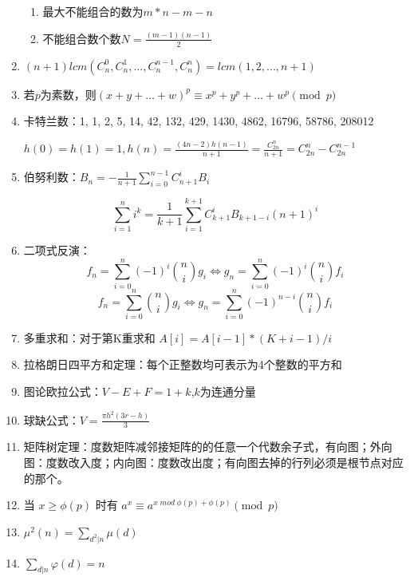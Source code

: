 \begin{enumerate}
\begin{enumerate}
\item 最大不能组合的数为$m*n-m-n$
\item 不能组合数个数$N=\frac{(m-1)(n-1)}{2}$
\end{enumerate}

\item $(n+1)lcm(C_n^0,C_n^1,...,C_n^{n-1},C_n^{n})=lcm(1,2,...,n+1)$

\item 若$p$为素数，则$(x+y+...+w)^p\equiv x^p+y^p+...+w^p\pmod p$

\item 卡特兰数：1, 1, 2, 5, 14, 42, 132, 429, 1430, 4862, 16796, 58786, 208012

$h(0)=h(1)=1,h(n)=\frac{(4n-2)h(n-1)}{n+1}=\frac{C_{2n}^n}{n+1}=C_{2n}^n-C_{2n}^{n-1}$

\item 伯努利数：$B_n = -\frac{1}{n+1} \sum_{i=0}^{n-1} C_{n+1}^i B_i$

$$\sum_{i=1}^n i^k = \frac{1}{k+1} \sum_{i=1}^{k+1}C_{k+1}^i B_{k+1-i}(n+1)^i$$

\item 二项式反演：$$f_n = \sum_{i = 0} ^ n (-1) ^ i \binom{n}{i} g_i \Leftrightarrow g_n = \sum_{i = 0} ^ n (-1) ^ i \binom{n}{i} f_i$$
$$f_n = \sum_{i = 0} ^ n \binom{n}{i} g_i \Leftrightarrow g_n = \sum_{i = 0} ^ n (-1) ^ {n - i} \binom{n}{i} f_i$$

\item 多重求和：对于第K重求和 $A[i]=A[i-1]*(K+i-1)/i$

\item 拉格朗日四平方和定理：每个正整数均可表示为4个整数的平方和

\item 图论欧拉公式：$V-E+F=1+k$,$k$为连通分量

\item 球缺公式：$V=\frac{\pi h^2(3r-h)}{3}$

\item 矩阵树定理：度数矩阵减邻接矩阵的的任意一个代数余子式，有向图；外向图：度数改入度；内向图：度数改出度；有向图去掉的行列必须是根节点对应的那个。

\item 当 $x\geq\phi(p)$ 时有 $a^x\equiv a^{x \; mod \; \phi(p) + \phi(p)}\pmod p$

\item $\mu^2(n)=\sum_{d^2|n} \mu(d)​$

\item $\sum_{d|n} \varphi(d)=n$


\end{enumerate}
